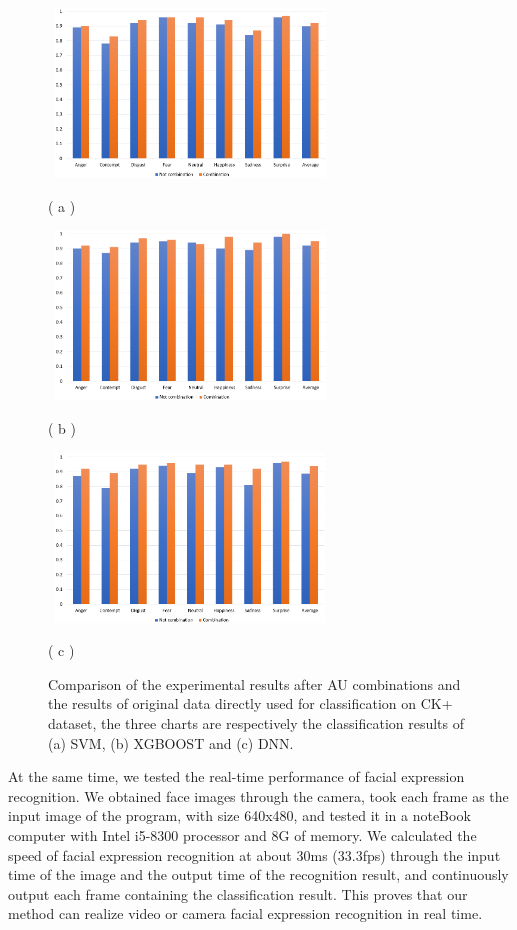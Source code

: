 \documentclass[10pt, conference, compsocconf]{IEEEtran}
\begin{document}
\begin{figure}
	\centering
	\begin{minipage}[c]{0.5\textwidth}
		\centering
		\includegraphics[height=4.5cm,width=7.5cm]{SVM}
	\end{minipage}
	( a )
	\begin{minipage}[c]{0.5\textwidth}
		\centering
		\includegraphics[height=4.5cm,width=7.5cm]{XGBOOST}
	\end{minipage}
	( b )
	\begin{minipage}[c]{0.5\textwidth}
		\centering
		\includegraphics[height=4.5cm,width=7.5cm]{DNN}
	\end{minipage}
	( c )
	\caption{Comparison of the experimental results after AU combinations and the results of original data directly used for classification on CK+ dataset, the three charts are respectively the classification results of (a) SVM, (b) XGBOOST and (c) DNN.}
\end{figure}

At the same time, we tested the real-time performance of facial expression recognition. We obtained face images through the camera, took each frame as the input image of the program, with size 640x480, and tested it in a noteBook computer with Intel i5-8300 processor and 8G of memory. We calculated the speed of facial expression recognition at about 30ms (33.3fps) through the input time of the image and the output time of the recognition result, and continuously output each frame  containing the classification result. This proves that our method can realize video or camera facial expression recognition in real time.
\end{document}

